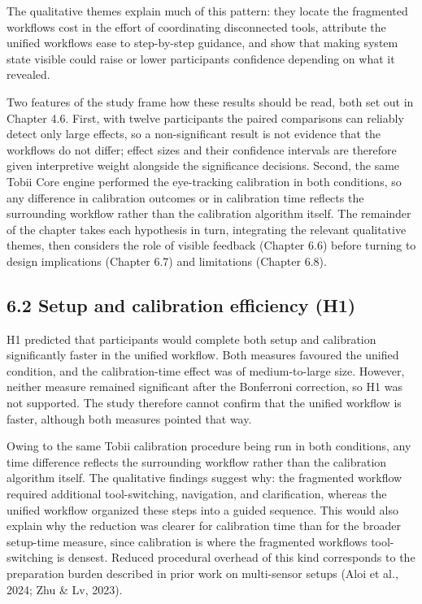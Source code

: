 \documentclass[
]{article}
\begin{document}
The qualitative themes explain much of this pattern: they locate the fragmented workflow\textquotesingle s cost in the effort of coordinating disconnected tools, attribute the unified workflow\textquotesingle s ease to step-by-step guidance, and show that making system state visible could raise or lower participants\textquotesingle{} confidence depending on what it revealed.

Two features of the study frame how these results should be read, both set out in Chapter 4.6. First, with twelve participants the paired comparisons can reliably detect only large effects, so a non-significant result is not evidence that the workflows do not differ; effect sizes and their confidence intervals are therefore given interpretive weight alongside the significance decisions. Second, the same Tobii Core engine performed the eye-tracking calibration in both conditions, so any difference in calibration outcomes or in calibration time reflects the surrounding workflow rather than the calibration algorithm itself. The remainder of the chapter takes each hypothesis in turn, integrating the relevant qualitative themes, then considers the role of visible feedback (Chapter 6.6) before turning to design implications (Chapter 6.7) and limitations (Chapter 6.8).

\hypertarget{setup-and-calibration-efficiency-h1}{%
\subsection{6.2 Setup and calibration efficiency (H1)}\label{setup-and-calibration-efficiency-h1}}

H1 predicted that participants would complete both setup and calibration significantly faster in the unified workflow. Both measures favoured the unified condition, and the calibration-time effect was of medium-to-large size. However, neither measure remained significant after the Bonferroni correction, so H1 was not supported. The study therefore cannot confirm that the unified workflow is faster, although both measures pointed that way.

Owing to the same Tobii calibration procedure being run in both conditions, any time difference reflects the surrounding workflow rather than the calibration algorithm itself. The qualitative findings suggest why: the fragmented workflow required additional tool-switching, navigation, and clarification, whereas the unified workflow organized these steps into a guided sequence. This would also explain why the reduction was clearer for calibration time than for the broader setup-time measure, since calibration is where the fragmented workflow\textquotesingle s tool-switching is densest. Reduced procedural overhead of this kind corresponds to the preparation burden described in prior work on multi-sensor setups (Aloi et al., 2024; Zhu \& Lv, 2023).
\end{document}
